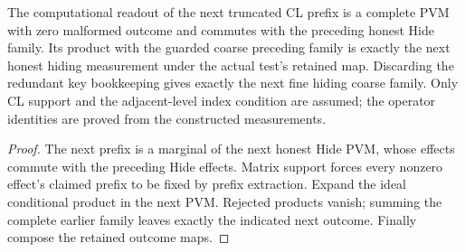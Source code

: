 \begin{lemma}
\label{lem:intro-concrete-ideal-step}
\leanok
The computational readout of the next truncated CL prefix is a complete
PVM with zero malformed outcome and commutes with the preceding honest
Hide family. Its product with the guarded coarse preceding family is exactly
the next honest hiding measurement under the actual test's retained map.
Discarding the redundant key bookkeeping gives exactly the next fine hiding
coarse family. Only CL support and the adjacent-level index condition are
assumed; the operator identities are proved from the constructed measurements.
\end{lemma}
\begin{proof}
\leanok
The next prefix is a marginal of the next honest Hide PVM, whose effects
commute with the preceding Hide effects. Matrix support forces every nonzero
effect's claimed prefix to be fixed by prefix extraction. Expand the ideal
conditional product in the next PVM. Rejected products vanish; summing the
complete earlier family leaves exactly the indicated next outcome. Finally
compose the retained outcome maps.
\end{proof}

